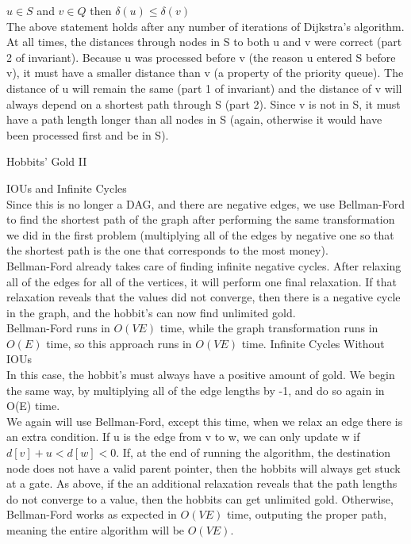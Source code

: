 \documentclass[12pt,twoside]{article}
\begin{document}
\begin{problems}
\begin{problemparts}
\problempart $u \in S$ and $v \in Q$ then $\delta(u) \le \delta(v)$\\
The above statement holds after any number of iterations of Dijkstra's algorithm.  At all times, the distances through nodes in S to both u and v were correct (part 2 of invariant).  Because u was processed before v (the reason u entered S before v), it must have a smaller distance than v (a property of the priority queue).  The distance of u will remain the same (part 1 of invariant) and the distance of v will always depend on a shortest path through S (part 2).  Since v is not in S, it must have a path length longer than all nodes in S (again, otherwise it would have been processed first and be in S).
\\
\end{problemparts}
\problem Hobbits' Gold II
\begin{problemparts}
\problempart IOUs and Infinite Cycles\\
Since this is no longer a DAG, and there are negative edges, we use Bellman-Ford to find the shortest path of the graph after performing the same transformation we did in the first problem (multiplying all of the edges by negative one so that the shortest path is the one that corresponds to the most money).\\

Bellman-Ford already takes care of finding infinite negative cycles.  After relaxing all of the edges for all of the vertices, it will perform one final relaxation.  If that relaxation reveals that the values did not converge, then there is a negative cycle in the graph, and the hobbit's can now find unlimited gold.\\

Bellman-Ford runs in $O(VE)$ time, while the graph transformation runs in $O(E)$ time, so this approach runs in $O(VE)$ time.
\problempart Infinite Cycles Without IOUs\\
In this case, the hobbit's must always have a positive amount of gold.  We begin the same way, by multiplying all of the edge lengths by -1, and do so again in O(E) time.\\

We again will use Bellman-Ford, except this time, when we relax an edge there is an extra condition.  If u is the edge from v to w, we can only update w if $d[v] + u < d[w] < 0$.  If, at the end of running the algorithm, the destination node does not have a valid parent pointer, then the hobbits will always get stuck at a gate.  As above, if the an additional relaxation reveals that the path lengths do not converge to a value, then the hobbits can get unlimited gold.  Otherwise, Bellman-Ford works as expected in $O(VE)$ time, outputing the proper path, meaning the entire algorithm will be $O(VE)$.  


\end{problemparts}
\end{problems}
\end{document}
